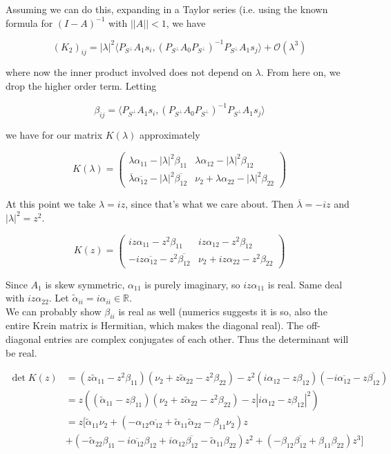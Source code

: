 \documentclass[12pt]{article}
\def\R{{\mathbb R}}
\begin{document}
Assuming we can do this, expanding in a Taylor series (i.e. using the known formula for $(I - A)^{-1}$ with $||A|| < 1$, we have

\[
(K_2)_{ij} = |\lambda|^2 \langle P_{S^\perp} A_1 s_i, ( P_{S^\perp} A_0 P_{S^\perp})^{-1} P_{S^\perp} A_1 s_j \rangle + \mathcal{O} (\lambda^3)
\]

where now the inner product involved does not depend on $\lambda$. From here on, we drop the higher order term. Letting 

\[
\beta_{ij} = \langle P_{S^\perp} A_1 s_i, ( P_{S^\perp} A_0 P_{S^\perp})^{-1} P_{S^\perp} A_1 s_j \rangle
\]

we have for our matrix $K(\lambda)$ approximately

\[
K(\lambda) = \begin{pmatrix}
\lambda \alpha_{11} - |\lambda|^2 \beta_{11} & \lambda \alpha_{12} - |\lambda|^2 \beta_{12} \\
\overline{\lambda} \overline{\alpha_{12}} - |\lambda|^2 \overline{\beta_{12}} & \nu_2 + \lambda \alpha_{22} - |\lambda|^2 \beta_{22}
\end{pmatrix}
\]

At this point we take $\lambda = i z$, since that's what we care about. Then $\overline{\lambda} = -iz$ and $|\lambda|^2 = z^2$.

\[
K(z) = \begin{pmatrix}
iz \alpha_{11} - z^2 \beta_{11} & iz \alpha_{12} - z^2 \beta_{12} \\
-iz \overline{\alpha_{12}} - z^2 \overline{\beta_{12}} & \nu_2 + iz \alpha_{22} - z^2 \beta_{22}
\end{pmatrix}
\]

Since $A_1$ is skew symmetric, $\alpha_{11}$ is purely imaginary, so $iz \alpha_{11}$ is real. Same deal with $iz \alpha_{22}$. Let $\tilde{\alpha}_{ii} = i \alpha_{ii} \in \R$.\\

We can probably show $\beta_{ii}$ is real as well (numerics suggests it is so, also the entire Krein matrix is Hermitian, which makes the diagonal real). The off-diagonal entries are complex conjugates of each other. Thus the determinant will be real. 

\begin{align*}
\det K(z) &= (z \tilde{\alpha}_{11} - z^2 \beta_{11})(\nu_2 + z \tilde{\alpha}_{22} - z^2 \beta_{22}) - z^2(i \alpha_{12} - z \beta_{12})(-i \overline{\alpha_{12}} - z \overline{\beta_{12}} ) \\
&= z((\tilde{\alpha}_{11} - z \beta_{11})(\nu_2 + z \tilde{\alpha}_{22} - z^2 \beta_{22}) - z|i \alpha_{12} - z \beta_{12}|^2)\\
&= z[\tilde{\alpha}_{11} \nu_2 + (-\alpha_{12} \overline{\alpha_{12}} + \tilde{\alpha}_{11} \tilde{\alpha}_{22} - \beta_{11}\nu_2)z \\
&+ (-\tilde{\alpha}_{22}\beta_{11} - i \overline{\alpha_{12}} \beta_{12} + i \alpha_{12} \overline{\beta_{12}} - \tilde{\alpha}_{11}\beta_{22})z^2 + (-\beta_{12}\overline{\beta_{12}} + \beta_{11}\beta_{22})z^3]
\end{align*}
\end{document}
